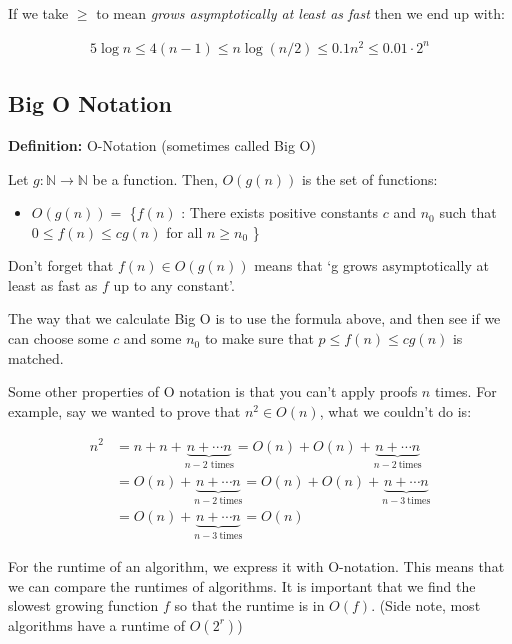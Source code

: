 \documentclass[11pt,a4paper,titlepage,dvipsnames,cmyk]{scrartcl}
\begin{document}
If we take $\ge$ to mean \textit{grows asymptotically at least as fast}
then we end up with:

\begin{align*}
    5 \log n \le 4(n-1) \le n \log (n/2) \le 0.1n^2 \le 0.01 \cdot 2^n
\end{align*}

\subsection{Big O Notation}%
\label{sub:big-o}

\begin{tcolorbox}
    \textbf{Definition:} O-Notation (sometimes called Big O)
    \medskip

    Let $g : \mathbb{N} \rightarrow \mathbb{N}$ be a function. Then,
    $O(g(n))$ is the set of functions:
    \medskip

    \begin{itemize}[label={},itemindent=-5em,leftmargin=5em]
        \item $O(g(n)) = $ \{$f(n)$ : There exists positive constants $c$
            and $n_0$ such that $0 \le f(n) \le cg(n)$ for all $n \ge n_0$
            \}
    \end{itemize}
\end{tcolorbox}

Don't forget that $f(n) \in O(g(n))$ means that `g grows asymptotically at
least as fast as $f$ up to any constant'.

The way that we calculate Big O is to use the formula above, and then see
if we can choose some $c$ and some $n_0$ to make sure that $p \le f(n) \le
cg(n)$ is matched.

Some other properties of O notation is that you can't apply proofs $n$
times. For example, say we wanted to prove that $n^2 \in O(n)$, what we
couldn't do is:

\begin{align*}
    n^2 &= n + n + \underbrace{n + \cdots n}_{n-2 \text{ times}} = O(n) +
    O(n) + \underbrace{n + \cdots n}_{n-2 \ \text{times}} \\
        &= O(n) +\underbrace{n + \cdots n}_{n-2 \ \text{times}} = O(n) +
        O(n) + \underbrace{n + \cdots n}_{n-3 \ \text{times}} \\
        &= O(n) + \underbrace{n + \cdots n}_{n-3 \ \text{times}} = O(n)
\end{align*}

For the runtime of an algorithm, we express it with O-notation. This means
that we can compare the runtimes of algorithms. It is important that we
find the slowest growing function $f$ so that the runtime is in $O(f)$.
(Side note, most algorithms have a runtime of $O(2^r)$)
\end{document}
